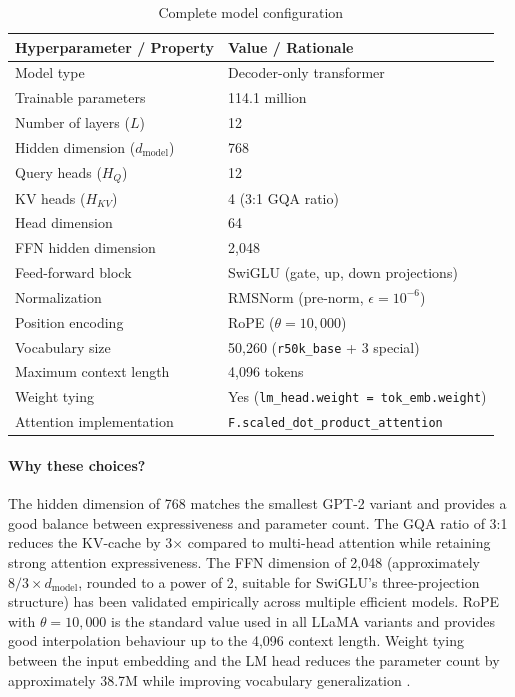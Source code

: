 \documentclass[12pt]{article}
\begin{document}
\begin{table}[H]
  \centering
  \caption{Complete model configuration}
  \begin{tabular}{L{6cm} L{6.5cm}}
    \toprule
    \textbf{Hyperparameter / Property} & \textbf{Value / Rationale} \\
    \midrule
    Model type & Decoder-only transformer \\
    Trainable parameters & 114.1 million \\
    Number of layers ($L$) & 12 \\
    Hidden dimension ($d_\text{model}$) & 768 \\
    Query heads ($H_Q$) & 12 \\
    KV heads ($H_{KV}$) & 4 (3:1 GQA ratio) \\
    Head dimension & 64 \\
    FFN hidden dimension & 2,048 \\
    Feed-forward block & SwiGLU (gate, up, down projections) \\
    Normalization & RMSNorm (pre-norm, $\epsilon=10^{-6}$) \\
    Position encoding & RoPE ($\theta=10{,}000$) \\
    Vocabulary size & 50,260 (\texttt{r50k\_base} + 3 special) \\
    Maximum context length & 4,096 tokens \\
    Weight tying & Yes (\texttt{lm\_head.weight = tok\_emb.weight}) \\
    Attention implementation & \texttt{F.scaled\_dot\_product\_attention} \\
    \bottomrule
  \end{tabular}
  \label{tab:model_config}
\end{table}

\paragraph{Why these choices?}
The hidden dimension of 768 matches the smallest GPT-2 variant and provides a good balance between expressiveness and parameter count. The GQA ratio of 3:1 reduces the KV-cache by 3$\times$ compared to multi-head attention while retaining strong attention expressiveness. The FFN dimension of 2,048 (approximately $8/3 \times d_\text{model}$, rounded to a power of 2, suitable for SwiGLU's three-projection structure) has been validated empirically across multiple efficient models. RoPE with $\theta=10{,}000$ is the standard value used in all LLaMA variants and provides good interpolation behaviour up to the 4,096 context length. Weight tying between the input embedding and the LM head reduces the parameter count by approximately 38.7M while improving vocabulary generalization \citep{radford2019language}.
\end{document}

